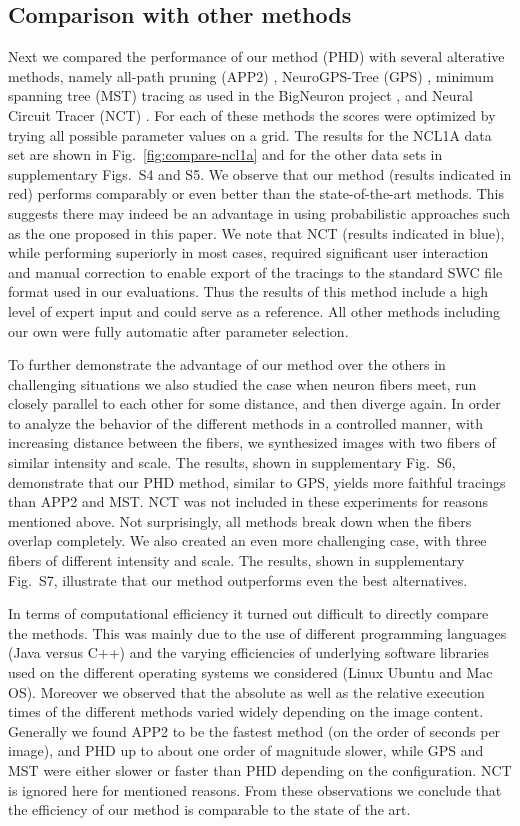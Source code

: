 \subsection{Comparison with other methods}
\label{subsec:comparison-with-other-methods}
Next we compared the performance of our method (PHD) with several alterative methods, namely all-path pruning (APP2) \citep{xiao2013app2}, NeuroGPS-Tree (GPS) \citep{quan2015neurogps}, minimum spanning tree (MST) tracing as used in the BigNeuron project \citep{Peng-2015}, and Neural Circuit Tracer (NCT) \citep{chothani2011automated}. For each of these methods the scores were optimized by trying all possible parameter values on a grid. The results for the NCL1A data set are shown in Fig.~\ref{fig:compare-ncl1a} and for the other data sets in supplementary Figs.~S4 and S5. We observe that our method (results indicated in red) performs comparably or even better than the state-of-the-art methods. This suggests there may indeed be an advantage in using probabilistic approaches such as the one proposed in this paper. We note that NCT (results indicated in blue), while performing superiorly in most cases, required significant user interaction and manual correction to enable export of the tracings to the standard SWC file format used in our evaluations. Thus the results of this method include a high level of expert input and could serve as a reference. All other methods including our own were fully automatic after parameter selection.

To further demonstrate the advantage of our method over the others in challenging situations we also studied the case when neuron fibers meet, run closely parallel to each other for some distance, and then diverge again. In order to analyze the behavior of the different methods in a controlled manner, with increasing distance between the fibers, we synthesized images with two fibers of similar intensity and scale. The results, shown in supplementary Fig.~S6, demonstrate that our PHD method, similar to GPS, yields more faithful tracings than APP2 and MST. NCT was not included in these experiments for reasons mentioned above. Not surprisingly, all methods break down when the fibers overlap completely. We also created an even more challenging case, with three fibers of different intensity and scale. The results, shown in supplementary Fig.~S7, illustrate that our method outperforms even the best alternatives.

In terms of computational efficiency it turned out difficult to directly compare the methods. This was mainly due to the use of different programming languages (Java versus C++) and the varying efficiencies of underlying software libraries used on the different operating systems we considered (Linux Ubuntu and Mac OS). Moreover we observed that the absolute as well as the relative execution times of the different methods varied widely depending on the image content. Generally we found APP2 to be the fastest method (on the order of seconds per image), and PHD up to about one order of magnitude slower, while GPS and MST were either slower or faster than PHD depending on the configuration. NCT is ignored here for mentioned reasons. From these observations we conclude that the efficiency of our method is comparable to the state of the art.

